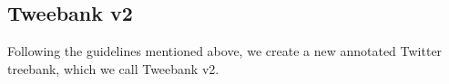 \documentclass[11pt,a4paper]{article}
\newcommand{\yjcomment}[1]{\textcolor{orange}{[$_\mathrm{L}^\mathrm{Y}$#1]}}
\newcommand{\nascomment}[1]{\textcolor{blue}{[#1 ---\textsc{nas}]}}
\begin{document}


\subsection{\sc Tweebank v2}
Following the guidelines mentioned above, we create a new annotated Twitter treebank, which we call {\sc Tweebank v2}.
\end{document}
